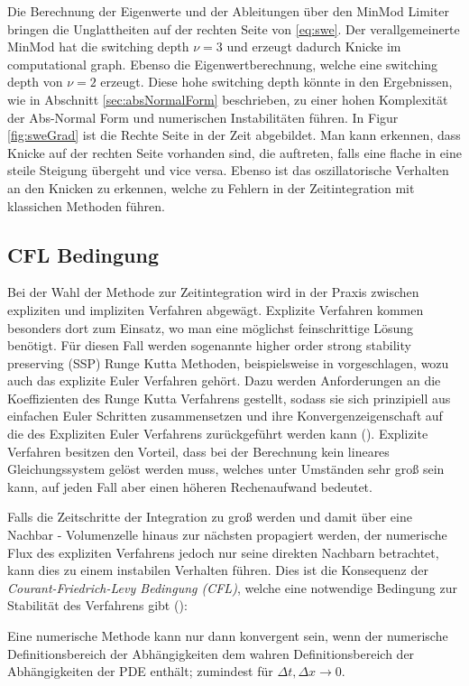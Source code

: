 Die Berechnung der Eigenwerte und der Ableitungen über den MinMod Limiter bringen die Unglattheiten auf der rechten Seite von \eqref{eq:swe}.  Der verallgemeinerte MinMod hat die switching depth $\nu = 3$ und erzeugt dadurch Knicke im computational graph. Ebenso die Eigenwertberechnung, welche eine switching depth von $\nu = 2$ erzeugt. Diese hohe switching depth könnte in den Ergebnissen, wie in Abschnitt \ref{sec:absNormalForm} beschrieben, zu einer hohen Komplexität der Abs-Normal Form und numerischen Instabilitäten führen. In Figur \ref{fig:sweGrad} ist die Rechte Seite in der Zeit abgebildet. Man kann erkennen, dass Knicke auf der rechten Seite vorhanden sind, die auftreten, falls eine flache in eine steile Steigung übergeht und vice versa. Ebenso ist das oszillatorische Verhalten an den Knicken zu erkennen, welche zu Fehlern in der Zeitintegration mit klassichen Methoden führen.

\subsection{CFL Bedingung}
Bei der Wahl der Methode zur Zeitintegration wird in der Praxis zwischen expliziten und impliziten Verfahren abgewägt. Explizite Verfahren kommen besonders dort zum Einsatz, wo man eine möglichst feinschrittige Lösung benötigt. Für diesen Fall werden sogenannte higher order strong stability preserving (SSP) Runge Kutta Methoden, beispielsweise in \cite{gottlieb2003strong} vorgeschlagen, wozu auch das explizite Euler Verfahren gehört. Dazu werden Anforderungen an die Koeffizienten des Runge Kutta Verfahrens gestellt, sodass sie sich prinzipiell aus einfachen Euler Schritten zusammensetzen und ihre Konvergenzeigenschaft auf die des Expliziten Euler Verfahrens zurückgeführt werden kann (\cite[Lemma 1.1]{gottlieb2003strong}). Explizite Verfahren besitzen den Vorteil, dass bei der Berechnung kein lineares Gleichungssystem gelöst werden muss, welches unter Umständen sehr groß sein kann, auf jeden Fall aber einen höheren Rechenaufwand bedeutet.

Falls die Zeitschritte der Integration zu groß werden und damit über eine Nachbar - Volumenzelle hinaus zur nächsten propagiert werden, der numerische Flux des expliziten Verfahrens jedoch nur seine direkten Nachbarn betrachtet, kann dies zu einem instabilen Verhalten führen. Dies ist die Konsequenz der \textit{Courant-Friedrich-Levy Bedingung (CFL)}, welche eine notwendige Bedingung zur Stabilität des Verfahrens gibt (\cite[S.69]{leveque2002finite}):
\begin{theorem*}
  Eine numerische Methode kann nur dann konvergent sein, wenn der numerische Definitionsbereich der Abhängigkeiten dem wahren Definitionsbereich der Abhängigkeiten der PDE enthält; zumindest für $\Delta t, \Delta x\to 0$.
\end{theorem*}

